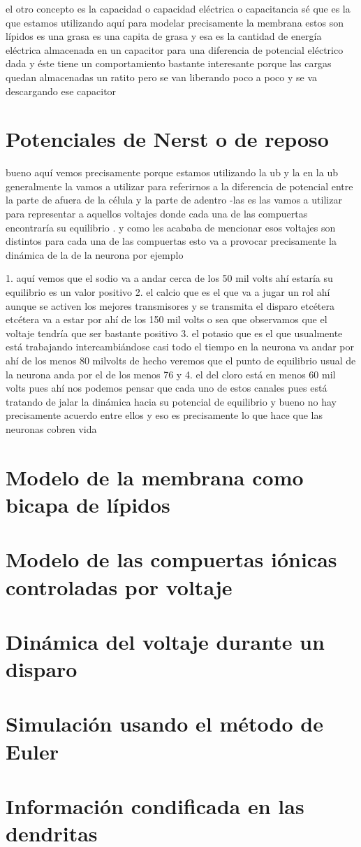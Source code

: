 el otro concepto es la capacidad o capacidad eléctrica o capacitancia sé que es la que estamos utilizando aquí para modelar precisamente la membrana estos son lípidos es una grasa es una capita de grasa y esa es la cantidad de energía eléctrica almacenada en un capacitor para una diferencia de potencial eléctrico dada y éste tiene un comportamiento bastante interesante porque las cargas quedan almacenadas un ratito pero se van liberando poco a poco y se va descargando ese capacitor 

\section{Potenciales de Nerst o de reposo}
bueno aquí vemos precisamente porque estamos utilizando la ub y la en la ub generalmente la vamos a utilizar para referirnos a la diferencia de potencial entre la parte de afuera de la célula y la parte de adentro -las es las vamos a utilizar para representar a aquellos voltajes donde cada una de las compuertas encontraría su equilibrio . y como les acababa de mencionar esos voltajes son distintos para cada una de las compuertas esto va a provocar precisamente la dinámica de la de la neurona por ejemplo 

1. aquí vemos que el sodio va a andar cerca de los 50 mil volts ahí estaría su equilibrio es un valor positivo 
2. el calcio que es el que va a jugar un rol ahí aunque se activen los mejores transmisores y se transmita el disparo etcétera etcétera va a estar por ahí de los 150 mil volts o sea que observamos que el voltaje tendría que ser bastante positivo 
3. el potasio que es el que usualmente está trabajando intercambiándose casi todo el tiempo en la neurona va andar por ahí de los menos 80 milvolts de hecho veremos que el punto de equilibrio usual de la neurona anda por el de los menos 76 y 
4. el del cloro está en menos 60 mil volts pues ahí nos podemos pensar que cada uno de estos canales pues está tratando de jalar la dinámica hacia su potencial de equilibrio y bueno no hay precisamente acuerdo entre ellos y eso es precisamente lo que hace que las neuronas cobren vida

\section{Modelo de la membrana como bicapa de lípidos}
\section{Modelo de las compuertas iónicas controladas por voltaje}
\section{Dinámica del voltaje durante un disparo} 
\section{Simulación usando el método de Euler}
\section{Información condificada en las dendritas}

